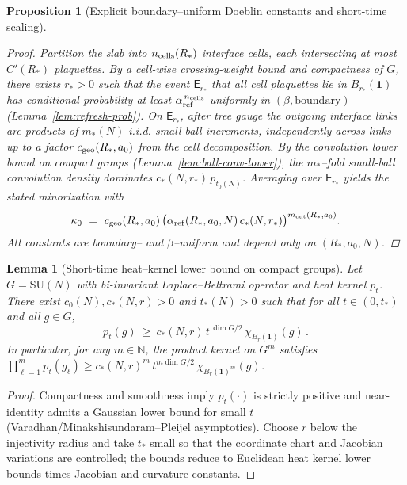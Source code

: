 \documentclass[11pt]{amsart}
\theoremstyle{plain}
\newtheorem{lemma}[theorem]{Lemma}
\newtheorem{proposition}[theorem]{Proposition}
\theoremstyle{definition}
\theoremstyle{remark}
\begin{document}
\begin{proposition}[Explicit boundary–uniform Doeblin constants and short-time scaling]
\begin{proof}
Partition the slab into $n_{\rm cells}(R_*)$ interface cells, each intersecting at most $C'(R_*)$ plaquettes. By a cell-wise crossing-weight bound and compactness of $G$, there exists $r_*>0$ such that the event $\mathsf E_{r_*}$ that all cell plaquettes lie in $B_{r_*}(\mathbf 1)$ has conditional probability at least $\alpha_{\rm ref}^{\,n_{\rm cells}}$ uniformly in $(\beta,\text{boundary})$ (Lemma~\ref{lem:refresh-prob}). On $\mathsf E_{r_*}$, after tree gauge the outgoing interface links are products of $m_*(N)$ i.i.d. small-ball increments, independently across links up to a factor $c_{\rm geo}(R_*,a_0)$ from the cell decomposition. By the convolution lower bound on compact groups (Lemma~\ref{lem:ball-conv-lower}), the $m_*$–fold small-ball convolution density dominates $c_*(N,r_*)\,p_{t_0(N)}$. Averaging over $\mathsf E_{r_*}$ yields the stated minorization with
\[
  \kappa_0\ =\ c_{\rm geo}(R_*,a_0)\,\big(\alpha_{\rm ref}(R_*,a_0,N)\,c_*(N,r_*)\big)^{m_{\rm cut}(R_*,a_0)}.
\]
All constants are boundary– and $\beta$–uniform and depend only on $(R_*,a_0,N)$.
\end{proof}
\end{proposition}

\begin{lemma}[Short-time heat--kernel lower bound on compact groups]\label{lem:hk-lower-explicit}
Let $G=\mathrm{SU}(N)$ with bi-invariant Laplace--Beltrami operator and heat kernel $p_t$. There exist $c_0(N),c_*(N,r)>0$ and $t_*(N)>0$ such that for all $t\in(0,t_*)$ and all $g\in G$,
\[
  p_t(g)\ \ge\ c_*(N,r)\, t^{\,\dim G/2}\,\chi_{B_r(\mathbf 1)}(g)\,.
\]
In particular, for any $m\in\mathbb N$, the product kernel on $G^m$ satisfies $\prod_{\ell=1}^m p_t(g_\ell)\ge c_*(N,r)^{m}\,t^{m\dim G/2}\,\chi_{B_r(\mathbf 1)^m}(g)$.
\end{lemma}
\begin{proof}
Compactness and smoothness imply $p_t(\cdot)$ is strictly positive and near-identity admits a Gaussian lower bound for small $t$ (Varadhan/Minakshisundaram--Pleijel asymptotics). Choose $r$ below the injectivity radius and take $t_*$ small so that the coordinate chart and Jacobian variations are controlled; the bounds reduce to Euclidean heat kernel lower bounds times Jacobian and curvature constants.
\end{proof}
\end{document}
